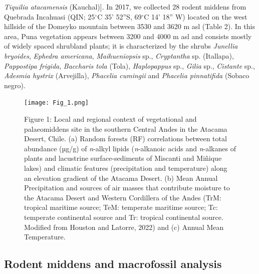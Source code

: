 \documentclass[
  authoryear,
  preprint,
  3p]{elsarticle}
\begin{document}
\emph{Tiquilia atacamensis} (Kauchal){]}. In 2017, we collected 28
rodent middens from Quebrada Incahuasi (QIN; 25\(^\circ\)C 35' 52''S,
69\(^\circ\)C 14' 18'' W) located on the west hillside of the Domeyko
mountain between 3530 and 3620 m asl (Table 2). In this area, Puna
vegetation appears between 3200 and 4000 m asl and consists mostly of
widely spaced shrubland plants; it is characterized by the shrubs
\emph{Junellia bryoides}, \emph{Ephedra americana}, \emph{Maihueniopsis}
sp., \emph{Cryptantha} sp. (Itallapa), \emph{Pappostipa frigida},
\emph{Baccharis tola} (Tola), \emph{Haplopappus} sp., \emph{Gilia} sp.,
\emph{Cistante} sp., \emph{Adesmia hystrix} (Arvejilla), \emph{Phacelia
cumingii} and \emph{Phacelia pinnatifida} (Sobaco negro).

\begin{figure}

{\centering \texttt{[image: Fig\_1.png]}

}

\caption{\label{fig-1}Figure 1: Local and regional context of
vegetational and palaeomiddens site in the southern Central Andes in the
Atacama Desert, Chile. (a) Random forests (RF) correlations between
total abundance (µg/g) of \emph{n}-alkyl lipids (\emph{n}-alkanoic acids
and \emph{n}-alkanes of plants and lacustrine surface-sediments of
Miscanti and Miñique lakes) and climatic features (precipitation and
temperature) along an elevation gradient of the Atacama Desert. (b) Mean
Annual Precipitation and sources of air masses that contribute moisture
to the Atacama Desert and Western Cordillera of the Andes (TrM: tropical
maritime source; TeM: temperate maritime source; Tc: temperate
continental source and Tr: tropical continental source. Modified from
Houston and Latorre, 2022) and (c) Annual Mean Temperature.}

\end{figure}

\hypertarget{rodent-middens-and-macrofossil-analysis}{%
\subsection{Rodent middens and macrofossil
analysis}\label{rodent-middens-and-macrofossil-analysis}}
\end{document}
